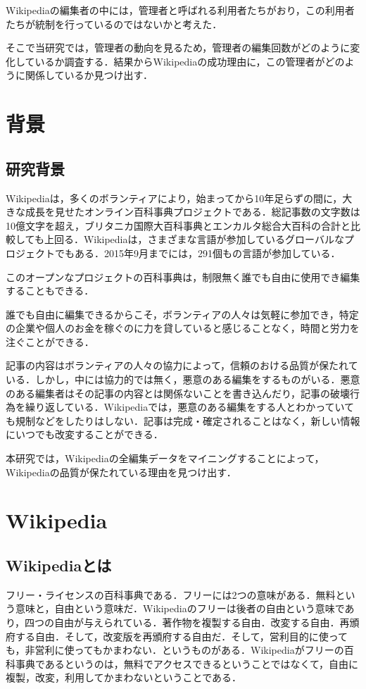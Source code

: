 Wikipediaの編集者の中には，管理者と呼ばれる利用者たちがおり，この利用者たちが統制を行っているのではないかと考えた．

そこで当研究では，管理者の動向を見るため，管理者の編集回数がどのように変化しているか調査する．結果からWikipediaの成功理由に，この管理者がどのように関係しているか見つけ出す．



\chapter{背景}

\section{研究背景}
Wikipediaは，多くのボランティアにより，始まってから10年足らずの間に，大きな成長を見せたオンライン百科事典プロジェクトである．総記事数の文字数は10億文字を超え，ブリタニカ国際大百科事典とエンカルタ総合大百科の合計と比較しても上回る．Wikipediaは，さまざまな言語が参加しているグローバルなプロジェクトでもある．2015年9月までには，291個もの言語が参加している．

このオープンなプロジェクトの百科事典は，制限無く誰でも自由に使用でき編集することもできる．

誰でも自由に編集できるからこそ，ボランティアの人々は気軽に参加でき，特定の企業や個人のお金を稼ぐのに力を貸していると感じることなく，時間と労力を注ぐことができる．

記事の内容はボランティアの人々の協力によって，信頼のおける品質が保たれている．しかし，中には協力的では無く，悪意のある編集をするものがいる．悪意のある編集者はその記事の内容とは関係ないことを書き込んだり，記事の破壊行為を繰り返している．Wikipediaでは，悪意のある編集をする人とわかっていても規制などをしたりはしない．記事は完成・確定されることはなく，新しい情報にいつでも改変することができる．

本研究では，Wikipediaの全編集データをマイニングすることによって，Wikipediaの品質が保たれている理由を見つけ出す．


\chapter{Wikipedia}

\section{Wikipediaとは}

フリー・ライセンスの百科事典である．フリーには2つの意味がある．無料という意味と，自由という意味だ．Wikipediaのフリーは後者の自由という意味であり，四つの自由が与えられている．著作物を複製する自由．改変する自由．再頒府する自由．そして，改変版を再頒府する自由だ．そして，営利目的に使っても，非営利に使ってもかまわない．というものがある．Wikipediaがフリーの百科事典であるというのは，無料でアクセスできるということではなくて，自由に複製，改変，利用してかまわないということである．

